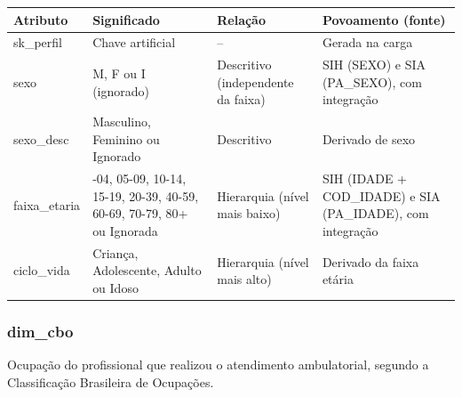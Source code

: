 \documentclass[12pt,a4paper]{article}
\begin{document}
{\small{}\begin{longtable}{|>{\raggedright\arraybackslash}p{}|>{\raggedright\arraybackslash}p{}|>{\raggedright\arraybackslash}p{}|>{\raggedright\arraybackslash}p{}|}\hline\rowcolor{azul}\color{white}\bfseries Atributo & \color{white}\bfseries Significado & \color{white}\bfseries Relação & \color{white}\bfseries Povoamento (fonte) \\ \hline\endhead
sk\_\allowbreak{}perfil & Chave artificial & – & Gerada na carga \\ \hline
sexo & M, F ou I (ignorado) & Descritivo (independente da faixa) & SIH (SEXO) e SIA (PA\_\allowbreak{}SEXO), com integração \\ \hline
sexo\_\allowbreak{}desc & Masculino, Feminino ou Ignorado & Descritivo & Derivado de sexo \\ \hline
faixa\_\allowbreak{}etaria & 00-04, 05-09, 10-14, 15-19, 20-39, 40-59, 60-69, 70-79, 80+ ou Ignorada & Hierarquia (nível mais baixo) & SIH (IDADE + COD\_\allowbreak{}IDADE) e SIA (PA\_\allowbreak{}IDADE), com integração \\ \hline
ciclo\_\allowbreak{}vida & Criança, Adolescente, Adulto ou Idoso & Hierarquia (nível mais alto) & Derivado da faixa etária \\ \hline\end{longtable}}

\subsubsection*{dim\_\allowbreak{}cbo}

Ocupação do profissional que realizou o atendimento ambulatorial, segundo a Classificação Brasileira de Ocupações.
\end{document}
